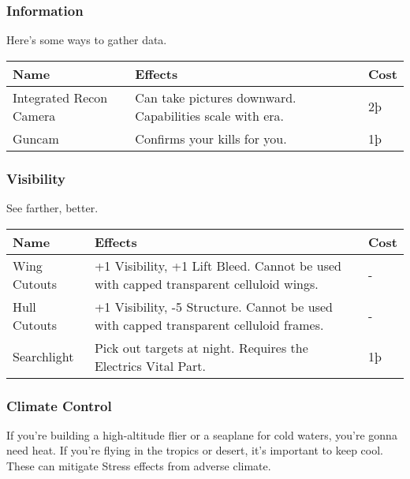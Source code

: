 \documentclass{article}
\begin{document}
\subsubsection{Information}
\label{_Information}

Here's some ways to gather data.

\begin{tabular}{|l|l|l|}
  \hline
  Name                    & Effects                                        & Cost \\\hline
  Integrated Recon Camera & Can take pictures downward. Capabilities scale
  with era.               & 2þ                                                    \\\hline
  Guncam                  & Confirms your kills for you.                   & 1þ   \\\hline
\end{tabular}

\subsubsection{Visibility}
\label{_Visibility}

See farther, better.

\begin{tabular}{|l|l|l|}
  \hline
  Name                          & Effects                                                  & Cost \\\hline
  Wing Cutouts                  & +1 Visibility, +1 Lift Bleed. Cannot be used with capped
  transparent celluloid wings.  & -                                                               \\\hline
  Hull Cutouts                  & +1 Visibility, -5 Structure. Cannot be used with capped
  transparent celluloid frames. & -                                                               \\\hline
  Searchlight                   & Pick out targets at night. Requires the Electrics Vital
  Part.                         & 1þ                                                              \\\hline
\end{tabular}

\subsubsection{Climate Control}
\label{_Climate_Control}

If you're building a high-altitude flier or a seaplane for cold waters,
you're gonna need heat. If you're flying in the tropics or desert, it's
important to keep cool. These can mitigate Stress effects from adverse
climate.
\end{document}
